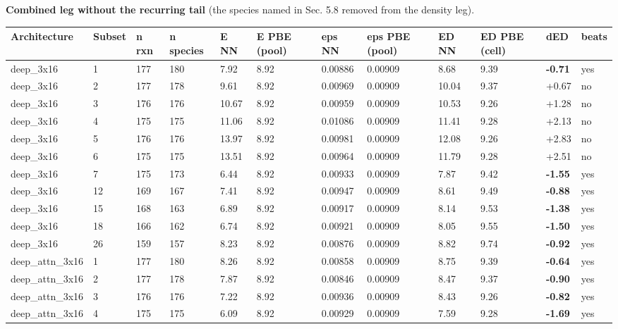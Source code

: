 \documentclass[10pt,a4paper]{article}
\begin{document}
\begin{landscape}
\textbf{Combined leg without the recurring tail} (the species named in Sec. 5.8 removed from the density leg).

\begin{footnotesize}
\begin{longtable}{llllllllllll}
\toprule Architecture & Subset & n rxn & n species & E NN & E PBE (pool) & eps NN & eps PBE (pool) & ED NN & ED PBE (cell) & dED & beats \\ \midrule \endhead
deep\_3x16 & 1 & 177 & 180 & 7.92 & 8.92 & 0.00886 & 0.00909 & 8.68 & 9.39 & \textbf{-0.71} & yes \\
deep\_3x16 & 2 & 177 & 178 & 9.61 & 8.92 & 0.00969 & 0.00909 & 10.04 & 9.37 & +0.67 & no \\
deep\_3x16 & 3 & 176 & 176 & 10.67 & 8.92 & 0.00959 & 0.00909 & 10.53 & 9.26 & +1.28 & no \\
deep\_3x16 & 4 & 175 & 175 & 11.06 & 8.92 & 0.01086 & 0.00909 & 11.41 & 9.28 & +2.13 & no \\
deep\_3x16 & 5 & 176 & 176 & 13.97 & 8.92 & 0.00981 & 0.00909 & 12.08 & 9.26 & +2.83 & no \\
deep\_3x16 & 6 & 175 & 175 & 13.51 & 8.92 & 0.00964 & 0.00909 & 11.79 & 9.28 & +2.51 & no \\
deep\_3x16 & 7 & 175 & 173 & 6.44 & 8.92 & 0.00933 & 0.00909 & 7.87 & 9.42 & \textbf{-1.55} & yes \\
deep\_3x16 & 12 & 169 & 167 & 7.41 & 8.92 & 0.00947 & 0.00909 & 8.61 & 9.49 & \textbf{-0.88} & yes \\
deep\_3x16 & 15 & 168 & 163 & 6.89 & 8.92 & 0.00917 & 0.00909 & 8.14 & 9.53 & \textbf{-1.38} & yes \\
deep\_3x16 & 18 & 166 & 162 & 6.74 & 8.92 & 0.00921 & 0.00909 & 8.05 & 9.55 & \textbf{-1.50} & yes \\
deep\_3x16 & 26 & 159 & 157 & 8.23 & 8.92 & 0.00876 & 0.00909 & 8.82 & 9.74 & \textbf{-0.92} & yes \\
deep\_attn\_3x16 & 1 & 177 & 180 & 8.26 & 8.92 & 0.00858 & 0.00909 & 8.75 & 9.39 & \textbf{-0.64} & yes \\
deep\_attn\_3x16 & 2 & 177 & 178 & 7.87 & 8.92 & 0.00846 & 0.00909 & 8.47 & 9.37 & \textbf{-0.90} & yes \\
deep\_attn\_3x16 & 3 & 176 & 176 & 7.22 & 8.92 & 0.00936 & 0.00909 & 8.43 & 9.26 & \textbf{-0.82} & yes \\
deep\_attn\_3x16 & 4 & 175 & 175 & 6.09 & 8.92 & 0.00929 & 0.00909 & 7.59 & 9.28 & \textbf{-1.69} & yes \\

\end{longtable}
\end{footnotesize}
\end{landscape}
\end{document}
